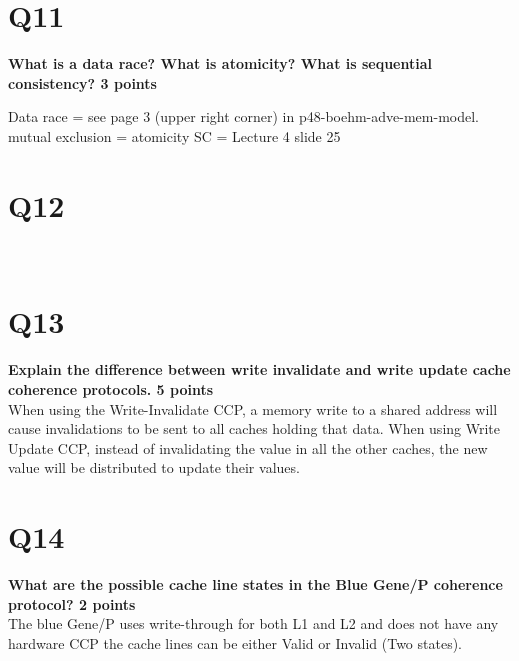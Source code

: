\documentclass[a4paper]{article}
\begin{document}

\section*{Q11}
\large{\textbf{
What is a data race? What is atomicity? What is sequential     consistency? 3 points\\}}

Data race = see page 3 (upper right corner) in p48-boehm-adve-mem-model.
mutual exclusion = atomicity
SC = Lecture 4 slide 25

\section*{Q12}
\large{\textbf{
\\}}

\section*{Q13}
\large{\textbf{
Explain the difference between write invalidate and write update cache coherence protocols. 5 points\\}}
When using the Write-Invalidate CCP, a memory write to a shared address will cause invalidations to be sent to all caches holding that data. When using Write Update CCP, instead of invalidating the value in all the other caches, the new value will be distributed to update their values.

\section*{Q14}
\large{\textbf{
What are the possible cache line states in the Blue Gene/P coherence protocol? 2 points\\}}
The blue Gene/P uses write-through for both L1 and L2 and does not have any hardware CCP the cache lines can be either Valid or Invalid (Two states).
\end{document}

